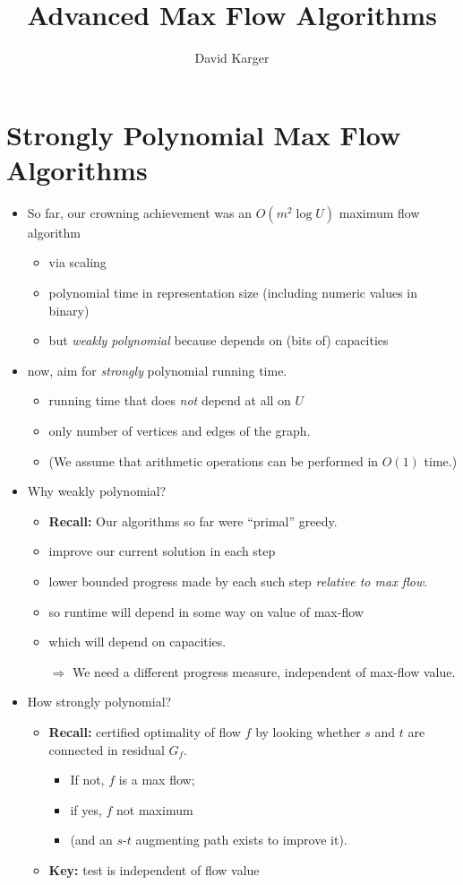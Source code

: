 \documentclass{article}
\title{Advanced Max Flow Algorithms}
\author{David Karger}
\begin{document}
\section{Strongly Polynomial Max Flow Algorithms}

\begin{itemize}
\item So far, our crowning achievement was an $O(m^2 \log U)$ maximum flow algorithm
  \begin{itemize}
  \item via scaling
  \item polynomial time in representation size (including numeric values in binary)
  \item but \emph{weakly polynomial} because depends on (bits of) capacities
\end{itemize}
\item now, aim for {\em strongly} polynomial running time.
  \begin{itemize}
  \item running time that does {\em not} depend at all on $U$
  \item only number of vertices and edges of the graph.
  \item (We assume that arithmetic operations can be performed in $O(1)$ time.)
  \end{itemize}
\item Why weakly polynomial?

  \begin{itemize}
  \item \textbf{Recall:} Our algorithms so far were ``primal'' greedy.
  \item  improve our current solution in each step
  \item lower bounded progress made by each such step \emph{relative to max flow}.
  \item so runtime will depend in some way on value of max-flow
  \item which will depend on capacities.
  \item[$\Rightarrow$] We need a different progress measure, independent of max-flow value. 
  \end{itemize}

\item How strongly polynomial?
  \begin{itemize}
  \item \textbf{Recall:} certified optimality of flow $f$ by looking whether $s$ and $t$ are connected in residual $G_f$.
    \begin{itemize}
    \item If not, $f$ is a max flow;
    \item if yes, $f$ not maximum
    \item (and an $s$-$t$ augmenting path exists to improve it). 
    \end{itemize}
  \item \textbf{Key:} test is independent of flow value


\end{itemize}
\end{itemize}
\end{document}
